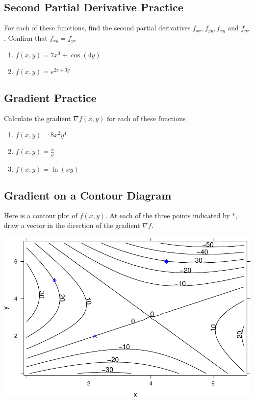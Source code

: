 \documentclass[
]{book}
\providecommand{\tightlist}{%
  \setlength{\itemsep}{0pt}\setlength{\parskip}{0pt}}
\begin{document}
\hypertarget{second-partial-derivative-practice}{%
\subsection{Second Partial Derivative Practice}\label{second-partial-derivative-practice}}

For each of these functions, find the second partial derivatives \(f_{xx}, f_{yy}, f_{xy}\) and \(f_{yx}\). Confirm that \(f_{xy} = f_{yx}\)

\begin{enumerate}
\def\labelenumi{\arabic{enumi}.}
\tightlist
\item
  \(f(x,y) = 7x^3 + \cos(4y)\)
\item
  \(f(x,y) = e^{2x+3y}\)
\end{enumerate}

\hypertarget{gradient-practice}{%
\subsection{Gradient Practice}\label{gradient-practice}}

Calculate the gradient \(\nabla f(x,y)\) for each of these functions

\begin{enumerate}
\def\labelenumi{\arabic{enumi}.}
\tightlist
\item
  \(f(x,y) = 8x^2y^4\)
\item
  \(\displaystyle{f(x,y) = \frac{x}{y}}\)
\item
  \(f(x,y) = \ln(xy)\)
\end{enumerate}

\hypertarget{gradient-on-a-contour-diagram}{%
\subsection{Gradient on a Contour Diagram}\label{gradient-on-a-contour-diagram}}

Here is a contour plot of \(f(x,y)\). At each of the three points indicated by \(*\), draw a vector in the direction of the gradient \(\nabla f\).

\includegraphics{_bookdown_files/math135_handbook_files/figure-latex/unnamed-chunk-92-1.pdf}
\end{document}
